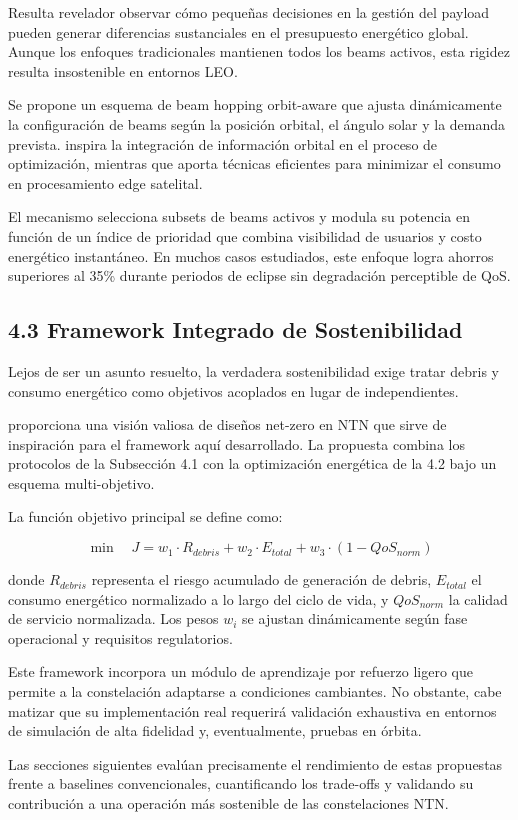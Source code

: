 Resulta revelador observar cómo pequeñas decisiones en la gestión del payload pueden generar diferencias sustanciales en el presupuesto energético global. Aunque los enfoques tradicionales mantienen todos los beams activos, esta rigidez resulta insostenible en entornos LEO.

Se propone un esquema de beam hopping orbit-aware que ajusta dinámicamente la configuración de beams según la posición orbital, el ángulo solar y la demanda prevista. \cite{MartinezGost2025} inspira la integración de información orbital en el proceso de optimización, mientras que \cite{Alnahdi2025} aporta técnicas eficientes para minimizar el consumo en procesamiento edge satelital.

El mecanismo selecciona subsets de beams activos y modula su potencia en función de un índice de prioridad que combina visibilidad de usuarios y costo energético instantáneo. En muchos casos estudiados, este enfoque logra ahorros superiores al 35\% durante periodos de eclipse sin degradación perceptible de QoS.

\subsection{4.3 Framework Integrado de Sostenibilidad}

Lejos de ser un asunto resuelto, la verdadera sostenibilidad exige tratar debris y consumo energético como objetivos acoplados en lugar de independientes. 

\cite{Jamshed2025} proporciona una visión valiosa de diseños net-zero en NTN que sirve de inspiración para el framework aquí desarrollado. La propuesta combina los protocolos de la Subsección 4.1 con la optimización energética de la 4.2 bajo un esquema multi-objetivo.

La función objetivo principal se define como:

\begin{equation}
\min \quad J = w_1 \cdot R_{debris} + w_2 \cdot E_{total} + w_3 \cdot (1 - QoS_{norm})
\label{eq:funcion_objetivo}
\end{equation}

donde $R_{debris}$ representa el riesgo acumulado de generación de debris, $E_{total}$ el consumo energético normalizado a lo largo del ciclo de vida, y $QoS_{norm}$ la calidad de servicio normalizada. Los pesos $w_i$ se ajustan dinámicamente según fase operacional y requisitos regulatorios.

Este framework incorpora un módulo de aprendizaje por refuerzo ligero que permite a la constelación adaptarse a condiciones cambiantes. No obstante, cabe matizar que su implementación real requerirá validación exhaustiva en entornos de simulación de alta fidelidad y, eventualmente, pruebas en órbita.

Las secciones siguientes evalúan precisamente el rendimiento de estas propuestas frente a baselines convencionales, cuantificando los trade-offs y validando su contribución a una operación más sostenible de las constelaciones NTN.